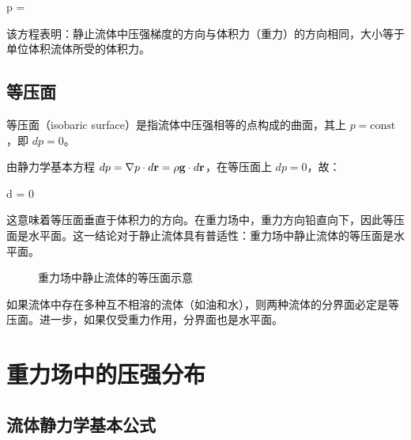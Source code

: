 \begin{myformula}
\Nabla p = \rho {}
\end{myformula}

该方程表明：静止流体中压强梯度的方向与体积力（重力）的方向相同，大小等于单位体积流体所受的体积力。

\subsection{等压面}

等压面（isobaric surface）是指流体中压强相等的点构成的曲面，其上 \(p = \text{const}\)，即 \(dp = 0\)。

由静力学基本方程 \(dp = \nabla p \cdot d\mathbf{r} = \rho \mathbf{g} \cdot d\mathbf{r}\)，在等压面上 \(dp=0\)，故：
\begin{myformula}
 \cdot d = 0
\end{myformula}

这意味着等压面垂直于体积力的方向。在重力场中，重力方向铅直向下，因此等压面是水平面。这一结论对于静止流体具有普适性：重力场中静止流体的等压面是水平面。

\begin{figure}[H]
\centering
{}
\caption{重力场中静止流体的等压面示意}
\label{fig:isobaric}
\end{figure}

\begin{remark}
如果流体中存在多种互不相溶的流体（如油和水），则两种流体的分界面必定是等压面。进一步，如果仅受重力作用，分界面也是水平面。
\end{remark}

\section{重力场中的压强分布}

\subsection{流体静力学基本公式}

